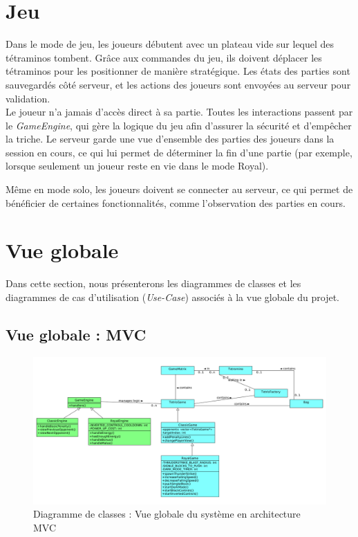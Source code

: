 \documentclass{report}
\begin{document}
\section{Jeu}

\noindent Dans le mode de jeu, les joueurs débutent avec un plateau vide sur lequel des tétraminos tombent. Grâce aux commandes du jeu, ils doivent déplacer les tétraminos pour les positionner de manière stratégique. Les états des parties sont sauvegardés côté serveur, et les actions des joueurs sont envoyées au serveur pour validation. \\

\noindent Le joueur n'a jamais d'accès direct à sa partie. Toutes les interactions passent par le \emph{GameEngine}, qui gère la logique du jeu afin d'assurer la sécurité et d'empêcher la triche. Le serveur garde une vue d'ensemble des parties des joueurs dans la session en cours, ce qui lui permet de déterminer la fin d'une partie (par exemple, lorsque seulement un joueur reste en vie dans le mode Royal).

\noindent Même en mode solo, les joueurs doivent se connecter au serveur, ce qui permet de bénéficier de certaines fonctionnalités, comme l’observation des parties en cours.

\section{Vue globale}

\noindent Dans cette section, nous présenterons les diagrammes de classes et les diagrammes de cas d’utilisation (\textit{Use-Case}) associés à la vue globale du projet.

\subsection{Vue globale : MVC}

\vspace{-1em}

\begin{figure}[H]
    \centering
    \includegraphics[width=\textwidth, keepaspectratio]{src/global.png}
    \caption{Diagramme de classes : Vue globale du système en architecture MVC}
    \label{fig:class_global_mvc}
\end{figure}
\end{document}
